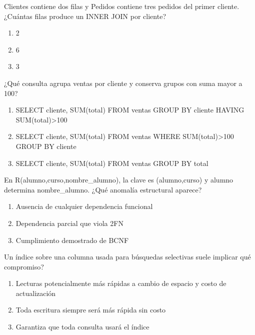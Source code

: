 \noindent\begin{minipage}{\linewidth}\setlength{\parskip}{4pt}\label{q:S-082}
Clientes contiene dos filas y Pedidos contiene tres pedidos del primer cliente. ¿Cuántas filas produce un INNER JOIN por cliente?
\begin{enumerate}[label=\Alph*),nosep]
\item 2
\item 6
\item 3
\end{enumerate}\end{minipage}\par\medskip

\noindent\begin{minipage}{\linewidth}\setlength{\parskip}{4pt}\label{q:S-083}
¿Qué consulta agrupa ventas por cliente y conserva grupos con suma mayor a 100?
\begin{enumerate}[label=\Alph*),nosep]
\item SELECT cliente, SUM(total) FROM ventas GROUP BY cliente HAVING SUM(total)>100
\item SELECT cliente, SUM(total) FROM ventas WHERE SUM(total)>100 GROUP BY cliente
\item SELECT cliente, SUM(total) FROM ventas GROUP BY total
\end{enumerate}\end{minipage}\par\medskip

\noindent\begin{minipage}{\linewidth}\setlength{\parskip}{4pt}\label{q:S-084}
En R(alumno,curso,nombre\_alumno), la clave es (alumno,curso) y alumno determina nombre\_alumno. ¿Qué anomalía estructural aparece?
\begin{enumerate}[label=\Alph*),nosep]
\item Ausencia de cualquier dependencia funcional
\item Dependencia parcial que viola 2FN
\item Cumplimiento demostrado de BCNF
\end{enumerate}\end{minipage}\par\medskip

\noindent\begin{minipage}{\linewidth}\setlength{\parskip}{4pt}\label{q:S-085}
Un índice sobre una columna usada para búsquedas selectivas suele implicar qué compromiso?
\begin{enumerate}[label=\Alph*),nosep]
\item Lecturas potencialmente más rápidas a cambio de espacio y costo de actualización
\item Toda escritura siempre será más rápida sin costo
\item Garantiza que toda consulta usará el índice
\end{enumerate}\end{minipage}\par\medskip


